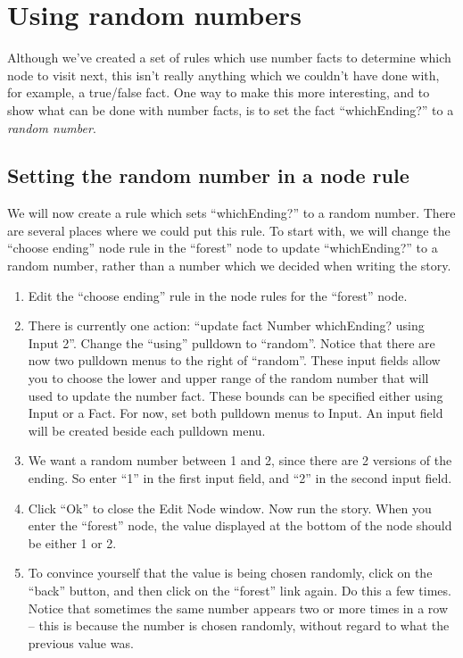 \documentclass{article}
\begin{document}

\section{Using random numbers}

Although we've created a set of rules which use number facts to determine which node to visit next, this isn't really anything which we couldn't have done with, for example, a true\slash false fact. One way to make this more interesting, and to show what can be done with number facts, is to set the fact ``whichEnding?'' to a \textit{random number}. 

\subsection{Setting the random number in a node rule}

We will now create a rule which sets ``whichEnding?'' to a random number. There are several places where we could put this rule. To start with, we will change the ``choose ending'' node rule in the ``forest'' node to update ``whichEnding?'' to a random number, rather than a number which we decided when writing the story.

\begin{enumerate}
    \item Edit the ``choose ending'' rule in the node rules for the  ``forest'' node.
    \item There is currently one action: ``update fact Number  whichEnding? using Input 2''. Change the ``using'' pulldown to  ``random''. Notice that there are now two pulldown menus to the right of ``random''. These input fields allow you to choose the lower and upper range of the random number that will used to update the number fact. These bounds can be specified either using Input or a Fact. For now, set both pulldown menus to Input. An input field will be created beside each pulldown menu.
    \item We want a random number between 1 and 2, since there are 2 versions of the ending. So enter ``1'' in the first input field, and ``2'' in the second input field. 
    \item Click ``Ok'' to close the Edit Node window. Now run the story. When you enter the ``forest'' node, the value displayed at the bottom of the node should be either 1 or 2.
    \item To convince yourself that the value is being chosen randomly, click on the ``back'' button, and then click on the ``forest'' link again. Do this a few times. Notice that sometimes the same number appears two or more times in a row -- this is because the number is chosen randomly, without regard to what the previous value was. 
\end{enumerate}
\end{document}
